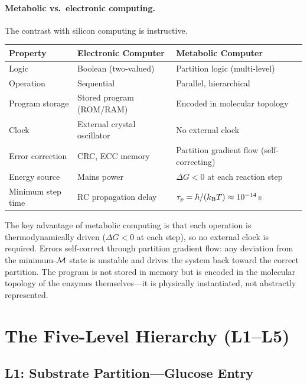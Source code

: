 \paragraph{Metabolic vs.\ electronic computing.}
The contrast with silicon computing is instructive.
\begin{center}
\begin{tabular}{lll}
\toprule
Property & Electronic Computer & Metabolic Computer \\
\midrule
Logic & Boolean (two-valued) & Partition logic (multi-level) \\
Operation & Sequential & Parallel, hierarchical \\
Program storage & Stored program (ROM/RAM) & Encoded in molecular topology \\
Clock & External crystal oscillator & No external clock \\
Error correction & CRC, ECC memory & Partition gradient flow (self-correcting) \\
Energy source & Mains power & $\Delta G < 0$ at each reaction step \\
Minimum step time & RC propagation delay & $\tau_p = \hbar/(k_{\mathrm{B}} T) \approx 10^{-14}$\,s \\
\bottomrule
\end{tabular}
\end{center}

The key advantage of metabolic computing is that each operation is
thermodynamically driven ($\Delta G < 0$ at each step), so no external
clock is required. Errors self-correct through partition gradient flow:
any deviation from the minimum-$\mathcal{M}$ state is unstable and drives
the system back toward the correct partition. The program is not stored
in memory but is encoded in the molecular topology of the enzymes
themselves---it is physically instantiated, not abstractly represented.

\section{The Five-Level Hierarchy (L1--L5)}
\label{sec:five_levels}

\subsection{L1: Substrate Partition---Glucose Entry}
\label{ssec:L1}

